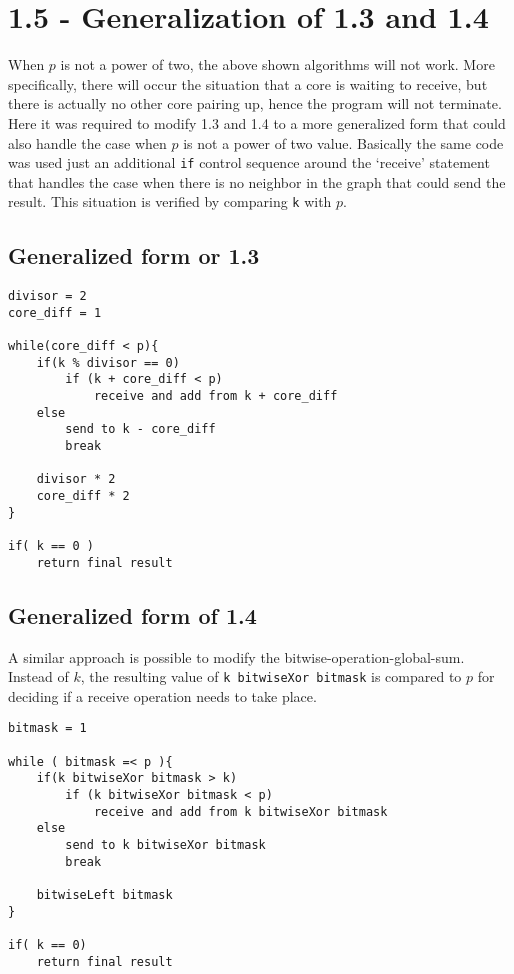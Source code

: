 \documentclass[a4paper,11pt,twoside]{article}
\begin{document}
\section{1.5 - Generalization of 1.3 and 1.4}
When $p$ is not a power of two, the above shown algorithms will not work. More specifically, there will occur the situation that a core is waiting to receive, but there is actually no other core pairing up, hence the program will not terminate. Here it was required to modify 1.3 and 1.4 to a more generalized form that could also handle the case when $p$ is not a power of two value.
Basically the same code was used just an additional \verb+if+ control sequence around the `receive' statement that handles the case when there is no neighbor in the graph that could send the result. This situation is verified by comparing \verb$k$ with $p$.  


\subsection{Generalized form or 1.3}
\begin{verbatim}
divisor = 2
core_diff = 1

while(core_diff < p){
    if(k % divisor == 0)
        if (k + core_diff < p)  
            receive and add from k + core_diff
    else 
        send to k - core_diff
        break

    divisor * 2
    core_diff * 2
}

if( k == 0 )
    return final result
\end{verbatim}

\subsection{Generalized form of 1.4}
A similar approach is possible to modify the bitwise-operation-global-sum. Instead of $k$, the resulting value of \verb+k bitwiseXor bitmask+ is compared to $p$ for deciding if a receive operation needs to take place.

\begin{verbatim}
bitmask = 1

while ( bitmask =< p ){
    if(k bitwiseXor bitmask > k)
        if (k bitwiseXor bitmask < p)
            receive and add from k bitwiseXor bitmask
    else
        send to k bitwiseXor bitmask
        break

    bitwiseLeft bitmask
}

if( k == 0)
    return final result
\end{verbatim}
\end{document}
